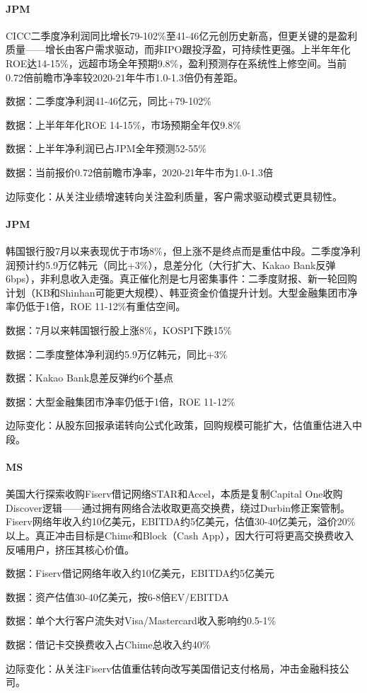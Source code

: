 \documentclass[11pt]{ctexart}
\begin{document}
\paragraph{JPM} CICC二季度净利润同比增长79-102\%至41-46亿元创历史新高，但更关键的是盈利质量——增长由客户需求驱动，而非IPO跟投浮盈，可持续性更强。上半年年化ROE达14-15\%，远超市场全年预期9.8\%，盈利预测存在系统性上修空间。当前0.72倍前瞻市净率较2020-21年牛市1.0-1.3倍仍有差距。
{\small\color{refgray}数据：二季度净利润41-46亿元，同比+79-102\%\par}
{\small\color{refgray}数据：上半年年化ROE 14-15\%，市场预期全年仅9.8\%\par}
{\small\color{refgray}数据：上半年净利润已占JPM全年预测52-55\%\par}
{\small\color{refgray}数据：当前报价0.72倍前瞻市净率，2020-21年牛市为1.0-1.3倍\par}
{\small\color{refgray}边际变化：从关注业绩增速转向关注盈利质量，客户需求驱动模式更具韧性。\par}
\paragraph{JPM} 韩国银行股7月以来表现优于市场8\%，但上涨不是终点而是重估中段。二季度净利润预计约5.9万亿韩元（同比+3\%），息差分化（大行扩大、Kakao Bank反弹6bps），非利息收入走强。真正催化剂是七月密集事件：二季度财报、新一轮回购计划（KB和Shinhan可能更大规模）、韩亚资金价值提升计划。大型金融集团市净率仍低于1倍，ROE 11-12\%有重估空间。
{\small\color{refgray}数据：7月以来韩国银行股上涨8\%，KOSPI下跌15\%\par}
{\small\color{refgray}数据：二季度整体净利润约5.9万亿韩元，同比+3\%\par}
{\small\color{refgray}数据：Kakao Bank息差反弹约6个基点\par}
{\small\color{refgray}数据：大型金融集团市净率仍低于1倍，ROE 11-12\%\par}
{\small\color{refgray}边际变化：从股东回报承诺转向公式化政策，回购规模可能扩大，估值重估进入中段。\par}
\paragraph{MS} 美国大行探索收购Fiserv借记网络STAR和Accel，本质是复制Capital One收购Discover逻辑——通过拥有网络合法收取更高交换费，绕过Durbin修正案管制。Fiserv网络年收入约10亿美元，EBITDA约5亿美元，估值30-40亿美元，溢价20\%以上。真正冲击目标是Chime和Block（Cash App），因大行可将更高交换费收入反哺用户，挤压其核心价值。
{\small\color{refgray}数据：Fiserv借记网络年收入约10亿美元，EBITDA约5亿美元\par}
{\small\color{refgray}数据：资产估值30-40亿美元，按6-8倍EV/EBITDA\par}
{\small\color{refgray}数据：单个大行客户流失对Visa/Mastercard收入影响约0.5-1\%\par}
{\small\color{refgray}数据：借记卡交换费收入占Chime总收入约40\%\par}
{\small\color{refgray}边际变化：从关注Fiserv估值重估转向改写美国借记支付格局，冲击金融科技公司。\par}
\end{document}
